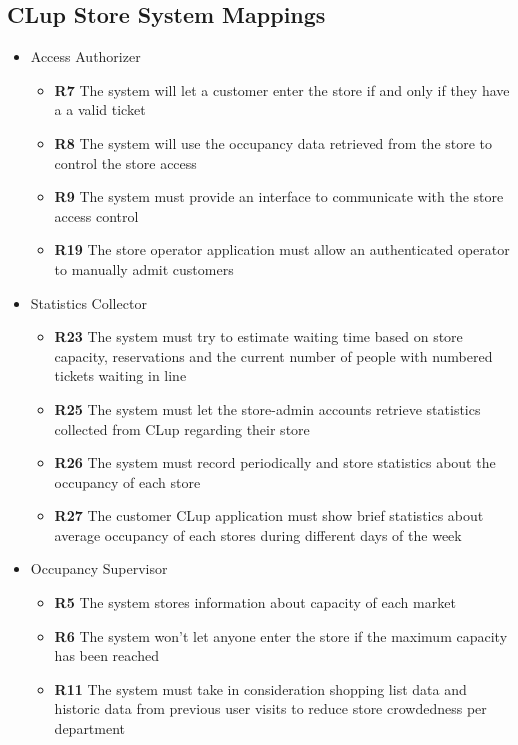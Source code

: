 \clearpage
\subsection{CLup Store System Mappings}
\begin{itemize}
    \item Access Authorizer
    \begin{itemize}
        \item \textbf{R7} The system will let a customer enter the store if and only if they have a a valid ticket
        \item \textbf{R8} The system will use the occupancy data retrieved from the store to control the store access
        \item \textbf{R9} The system must provide an interface to communicate with the store access control
        \item \textbf{R19} The store operator application must allow an authenticated operator to manually admit customers
    \end{itemize}
    \item Statistics Collector
    \begin{itemize}
        \item \textbf{R23} The system must try to estimate waiting time based on store capacity, reservations and the current number of people with numbered tickets waiting in line
        \item \textbf{R25} The system must let the store-admin accounts retrieve statistics collected from CLup regarding their store
        \item \textbf{R26} The system must record periodically and store statistics about the occupancy of each store
        \item \textbf{R27} The customer CLup application must show brief statistics about average occupancy of each stores during different days of the week
    \end{itemize}
    \item Occupancy Supervisor
    \begin{itemize}
        \item \textbf{R5} The system stores information about capacity of each market
        \item \textbf{R6} The system won’t let anyone enter the store if the maximum capacity has been reached
        \item \textbf{R11} The system must take in consideration shopping list data and historic data from previous user visits to reduce store crowdedness per department

\end{itemize}
\end{itemize}
